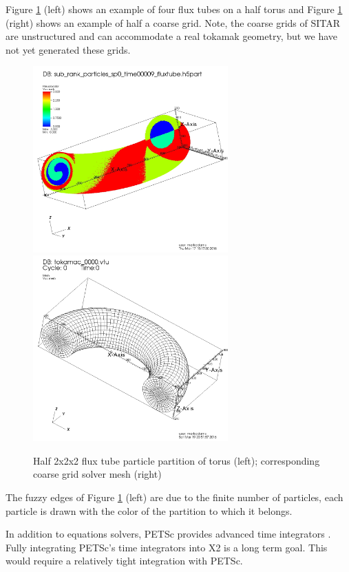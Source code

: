 \documentclass[review]{siamart}
\begin{document}
\clearpage
Figure \ref{fig:cross} (left) shows an example of four flux tubes on a half torus and Figure \ref{fig:cross} (right) shows an example of half a coarse grid.
Note, the coarse grids of SITAR are unstructured and can accommodate a real tokamak geometry, but we have not yet generated these grids.
\begin{figure}[h!]
   \centering
   \includegraphics[width=75mm]{half_grid.jpeg} 
    \includegraphics[width=75mm]{half_grid_mesh.jpeg} 
   \caption{Half 2x2x2 flux tube particle partition of torus (left); corresponding coarse grid solver mesh (right)}
   \label{fig:cross}
\end{figure}
The fuzzy edges of Figure \ref{fig:cross} (left) are due to the finite number of particles, each particle is drawn with the color of the partition to which it belongs.

In addition to equations solvers, PETSc provides advanced time integrators \cite{KnepleyBrownMcInnesSmithRuppAdams2015b}.
Fully integrating PETSc's time integrators into X2 is a long term goal.
This would require a relatively tight integration with PETSc.
\end{document}
